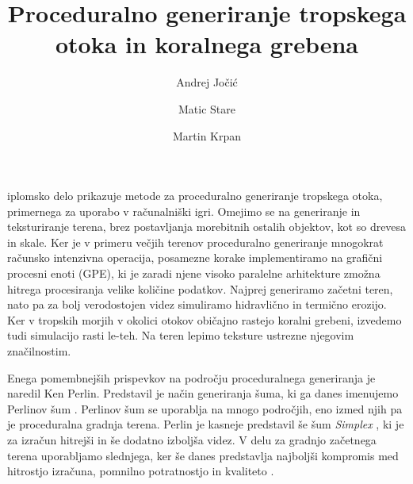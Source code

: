 \documentclass[9pt]{pnas-new}
\title{Proceduralno generiranje tropskega otoka in koralnega grebena}
\author{Andrej Jočić}
\author{Matic Stare}
\author{Martin Krpan}
\affil{Collective behaviour course research seminar report}
\begin{document}
\verticaladjustment{-2pt}

\maketitle
\thispagestyle{firststyle}

iplomsko delo prikazuje metode za proceduralno generiranje tropskega otoka, primernega za uporabo v računalniški igri. Omejimo se na generiranje in teksturiranje terena, brez postavljanja morebitnih ostalih objektov, kot so drevesa in skale. Ker je v primeru večjih terenov proceduralno generiranje mnogokrat računsko intenzivna operacija, posamezne korake implementiramo na grafični procesni enoti (GPE), ki je zaradi njene visoko paralelne arhitekture zmožna hitrega procesiranja velike količine podatkov. Najprej generiramo začetni teren, nato pa za bolj verodostojen videz simuliramo hidravlično in termično erozijo. Ker v tropskih morjih v okolici otokov običajno rastejo koralni grebeni, izvedemo tudi simulacijo rasti le-teh. Na teren lepimo teksture ustrezne njegovim značilnostim. 

Enega pomembnejših prispevkov na področju proceduralnega generiranja je naredil Ken Perlin. Predstavil je način generiranja šuma, ki ga danes imenujemo Perlinov šum \cite{perlin_noise_85}. Perlinov šum se uporablja na mnogo področjih, eno izmed njih pa je proceduralna gradnja terena. Perlin je kasneje predstavil še šum \emph{Simplex} \cite{simplex_noise_01}, ki je za izračun hitrejši in še dodatno izboljša videz. V delu za gradnjo začetnega terena uporabljamo slednjega, ker še danes predstavlja najboljši kompromis med hitrostjo izračuna, pomnilno potratnostjo in kvaliteto \cite{rose2016algorithms}.
\end{document}
